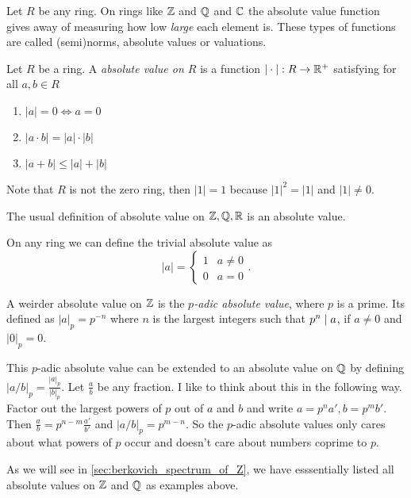 Let $R$ be any ring. On rings like $\mathbb{Z}$ and $\mathbb{Q}$ and $\mathbb{C}$ the absolute value function gives away of measuring how low \emph{large} each element is. 
These types of functions are called (semi)norms, absolute values or valuations. 
\begin{definition}
	Let $R$ be a ring. A \emph{absolute value on $R$} is a function $|\cdot |: R \to \mathbb{R}^{+}$ satisfying for all $a, b \in R$
	\begin{enumerate}
		\item $|a| = 0 \iff a = 0$ 
		\item $|a \cdot b| = |a| \cdot |b|$ 
		\item $|a + b| \le |a| + |b|$
	\end{enumerate}
\end{definition}
Note that $R$ is not the zero ring, then $|1| = 1$ because $|1|^2 = |1| $ and $|1|\ne 0 $. 
\begin{example}
	The usual definition of absolute value on $\mathbb{Z}, \mathbb{Q}, \mathbb{R}$ is an absolute value. 
\end{example}
\begin{example}
	On any ring we can define the trivial absolute value as \[
	 |a| = \begin{cases}
		 1 & a \ne 0 \\
		 0 & a = 0
	 \end{cases}
	.\] 
\end{example}
\begin{example}
	A weirder absolute value on $\mathbb{Z}$ is the \emph{$p$-adic absolute value}, where $p$ is a prime. 
	Its defined as $|a|_p = p^{-n}$ where $n$ is the largest integers such that $p^{n} \mid a$, if $a \ne 0$ and $|0|_p = 0$. 


	This $p$-adic absolute value can be extended to an absolute value on $\mathbb{Q}$ by defining $|a / b|_p = \frac{|a|_p}{|b|_p}$. Let $\frac{a}{b}$ be any fraction. 
	I like to think about this in the following way. 
	Factor out the largest powers of $p$ out of $a$ and $b$ and write $a = p^{n} a', b = p^{m} b'$. Then $\frac{a}{ b} = p^{n - m} \frac{a'}{ b'}$ and $|a / b|_p = p^{m - n}$. 
	So the $p$-adic absolute values only cares about what powers of $p$ occur and doesn't care about numbers coprime to $p $.
\end{example}
As we will see in \cref{sec:berkovich_spectrum_of_Z}, we have esssentially listed all absolute values on $\mathbb{Z}$ and $\mathbb{Q}$ as examples above.  

